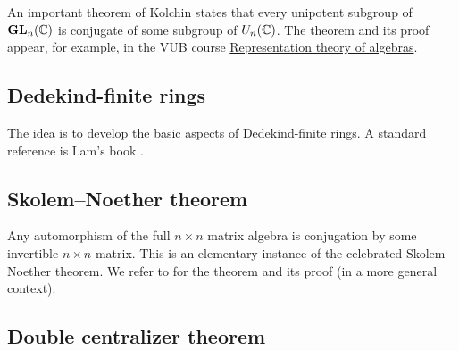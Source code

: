 An important theorem of Kolchin states that 
every unipotent subgroup of $\mathbf{GL}_n(\mathbb{C})$ is conjugate
of some subgroup of $U_n(\mathbb{C})$. The theorem and its proof 
appear, for example, 
in the 
VUB course \href{https://github.com/vendramin/representation}{Representation theory of algebras}.

\subsection*{Dedekind-finite rings}

The idea is to develop the basic aspects of Dedekind-finite rings.
A standard reference is Lam's book \cite{MR2278849}. 








\subsection*{Skolem--Noether theorem}

Any automorphism of the full $n\times n$ matrix algebra 
is conjugation by some invertible $n\times n$ matrix. This is an elementary 
instance of the celebrated Skolem--Noether theorem. We refer to 
\cite[Chapter 4]{MR3308118} for the theorem 
and its proof (in a more general context).

\subsection*{Double centralizer theorem}

